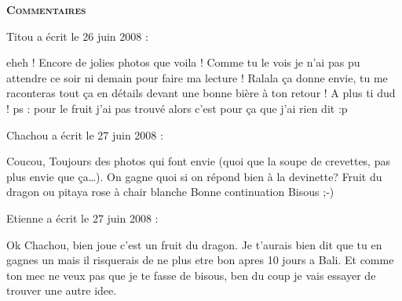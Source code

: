\bigskip
\textbf{\textsc{Commentaires}}

\medskip
Titou a écrit le 26 juin 2008 :
\begin{displayquote}
eheh ! Encore de jolies photos que voila ! Comme tu le vois je n'ai pas pu attendre ce soir ni demain pour faire ma lecture !
Ralala ça donne envie, tu me raconteras tout ça en détails devant une bonne bière à ton retour !
A plus ti dud !
ps : pour le fruit j'ai pas trouvé alors c'est pour ça que j'ai rien dit :p
\end{displayquote}

\medskip
Chachou a écrit le 27 juin 2008 :
\begin{displayquote}
Coucou,
Toujours des photos qui font envie (quoi que la soupe de crevettes, pas plus envie que ça\dots).
On gagne quoi si on répond bien à la devinette?
Fruit du dragon ou pitaya rose à chair blanche
Bonne continuation
Bisous ;-)
\end{displayquote}

\medskip
Etienne a écrit le 27 juin 2008 :
\begin{displayquote}
Ok Chachou, bien joue c'est un fruit du dragon. Je t'aurais bien dit que tu en gagnes un mais il risquerais de ne plus etre bon apres 10 jours a Bali. Et comme ton mec ne veux pas que je te fasse de bisous, ben du coup je vais essayer de trouver une autre idee.
\end{displayquote}

\vfill
